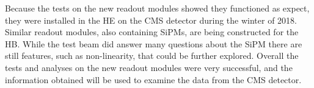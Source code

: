 Because the tests on the new readout modules showed they functioned as expect, they were installed in the HE on the CMS detector during the winter of 2018. Similar readout modules, also containing SiPMs, are being constructed for the HB. While the test beam did answer many questions about the SiPM there are still features, such as non-linearity, that could be further explored. Overall the tests and analyses on the new readout modules were very successful, and the information obtained will be used to examine the data from the CMS detector.


